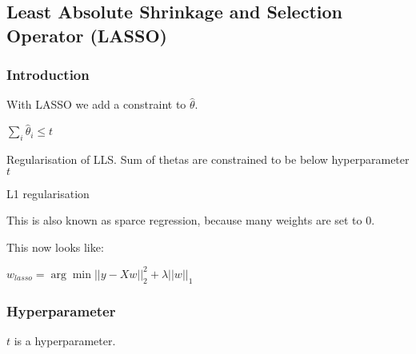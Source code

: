 
\subsection{Least Absolute Shrinkage and Selection Operator (LASSO)}

\subsubsection{Introduction}

With LASSO we add a constraint to \(\hat \theta \).

\(\sum_i \hat \theta_i \le t\)

Regularisation of LLS. Sum of thetas are constrained to be below hyperparameter \(t\)

L1 regularisation

This is also known as sparce regression, because many weights are set to \(0\).

This now looks like:

\(w_{lasso} = \arg \min ||y-Xw||^2_2+\lambda ||w||_1\)

\subsubsection{Hyperparameter}

\(t\) is a hyperparameter.

